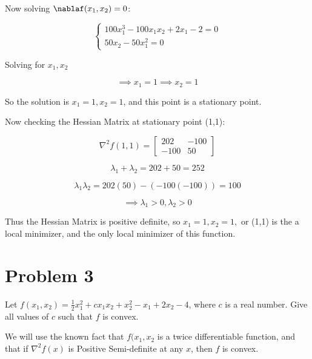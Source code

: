 \documentclass[12pt]{article}
\begin{document}
\vspace{3mm}

Now solving $\nablaf(x_{1}, x_{2}) = 0$:

\[\begin{cases}
100x_{1}^{3} - 100x_{1}x_{2} + 2x_{1}- 2  = 0\\ 
50x_{2} - 50x_{1}^{2} = 0
\end{cases}\]

\vspace{3mm}

Solving for $x_1, x_2$

\[  \implies x_{1} = 1 \implies x_{2} = 1 \]

\vspace{3mm}

So the solution is $x_{1} = 1, x_{2} = 1$, and this point is a stationary point.

\vspace{3mm}
\newpage
Now checking the Hessian Matrix at stationary point (1,1):

\[ \nabla^{2}f(1, 1) = \left[\begin{array}{ccc} 202 & - 100 \\ -100 & 50 \end{array}\right]\]

\[ \lambda_{1} + \lambda_{2} = 202 + 50 = 252 \]

\[ \lambda_{1} \lambda_{2} = 202(50) - (-100(-100)) = 100 \]

\[ \implies \lambda_{1} > 0, \lambda_{2} > 0\]

\vspace{3mm}

\noindent Thus the Hessian Matrix is positive definite, so $x_{1} = 1, x_{2} = 1,$ or (1,1) is the a local minimizer, and the only local minimizer of this function.

\newpage

\section*{Problem 3} 

Let $f(x_1, x_2) = \frac{1}{2}x_1^2 + cx_1x_2 + x_2^2 - x_1 + 2x_2 - 4$, where $c$ is a real number. Give all values of $c$ such that $f$ is convex. 

\vspace{9mm}

\noindent We will use the known fact that $f(x_{1}, x_{2}$ is a twice differentiable function, and that if $\nabla^{2}f(x)$ is Positive Semi-definite at any $x$, then $f$ is convex.
\end{document}
